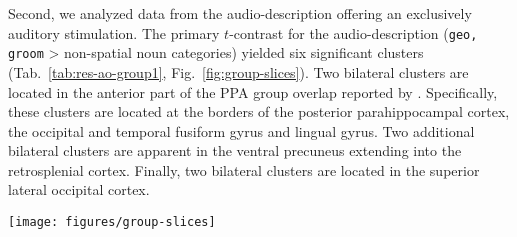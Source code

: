 \documentclass[english]{article}
\begin{document}
Second, we analyzed data from the audio-description offering an exclusively
auditory stimulation.
The primary $t$-contrast for the audio-description (\texttt{geo, groom} >
non-spatial noun categories) yielded six significant clusters
(Tab.~\ref{tab:res-ao-group1}, Fig.~\ref{fig:group-slices}).
Two bilateral clusters are located in the anterior part of the PPA group overlap
reported by \cite{sengupta2016extension}.
Specifically, these clusters are located at the borders of the posterior
parahippocampal cortex, the occipital and temporal fusiform gyrus and lingual
gyrus.
Two additional bilateral clusters are apparent in the ventral precuneus
extending into the retrosplenial cortex.
Finally, two bilateral clusters are located in the superior lateral occipital
cortex.

\begin{figure*}[tbp] \centering
    \texttt{[image: figures/group-slices]}

    \caption{Mixed-effects group-level (N=14) clusters ($Z$>3.4, $p$<.05
      cluster-corrected) of activity correlated with the processing of spatial
      information are displayed on top of the MNI152 T1-weighted head template,
      with the acquisition field-of-view for the audio-description study
      highlighted.
      The results of the audio-description's primary $t$-contrast (blue) that
      compares geometry-related nouns spoken by the narrator to non-spatial
      nouns (\texttt{geo, groom} > all non-spatial categories) are overlaid
      on the movie's primary $t$-contrast (red) that compares cuts to a
      setting depicted for the first time with cuts within a recurring setting
      (\texttt{vse\_new > vpe\_old}).
      For comparison, the union of the individual PPA localization reported
      by \cite{sengupta2016extension} are indicated as a black outline.
    }

    \label{fig:group-slices}
\end{figure*}
\end{document}

